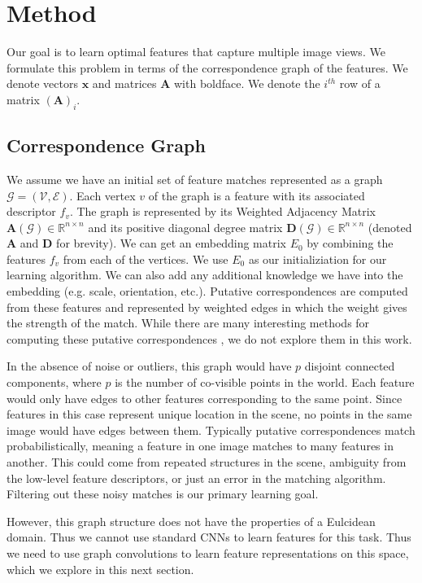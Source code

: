 \documentclass[10pt,twocolumn,letterpaper]{article}
\newcommand{\bR}{\mathbb{R}}
\newcommand{\mat}[1]{\mathbf{#1}}
\begin{document}
\section{Method}
Our goal is to learn optimal features that capture multiple image views.
We formulate this problem in terms of the correspondence graph of the features.
We denote vectors $\mat{x}$ and matrices $\mat{A}$ with boldface.
We denote the $i^{th}$ row of a matrix $(\mat{A})_i$.
\subsection{Correspondence Graph}
We assume we have an initial set of feature matches represented as a graph $\mathcal{G} = (\mathcal{V}, \mathcal{E})$.
Each vertex $v$ of the graph is a feature with its associated descriptor $f_v$. 
The graph is represented by its Weighted Adjacency Matrix $\mat{A}(\mathcal{G}) \in \bR^{n \times n}$ and its positive diagonal degree matrix $\mat{D}(\mathcal{G}) \in \bR^{n \times n}$ (denoted $\mat{A}$ and $\mat{D}$ for brevity).
We can get an embedding matrix $E_0$ by combining the features $f_v$ from each of the vertices.
We use $E_0$ as our initializiation for our learning algorithm.
We can also add any additional knowledge we have into the embedding (e.g. scale, orientation, etc.).
Putative correspondences are computed from these features and represented by weighted edges in which the weight gives the strength of the match.
While there are many interesting methods for computing these putative correspondences \cite{suh2015subgraph, yi2018learning}, we do not explore them in this work.

In the absence of noise or outliers, this graph would have $p$ disjoint connected components, where $p$ is the number of co-visible points in the world.
Each feature would only have edges to other features corresponding to the same point.
Since features in this case represent unique location in the scene, no points in the same image would have edges between them.
Typically putative correspondences match probabilistically, meaning a feature in one image matches to many features in another.
This could come from repeated structures in the scene, ambiguity from the low-level feature descriptors, or just an error in the matching algorithm.
Filtering out these noisy matches is our primary learning goal.

However, this graph structure does not have the properties of a Eulcidean domain.
Thus we cannot use standard CNNs to learn features for this task.
Thus we need to use graph convolutions to learn feature representations on this space, which we explore in this next section.
\end{document}
